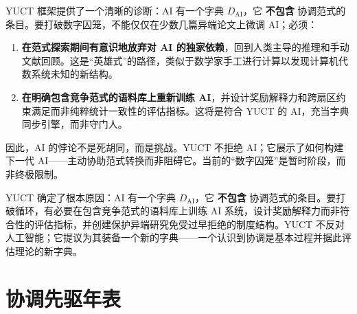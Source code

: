 \documentclass[12pt,a4paper]{article}
\begin{document}
	YUCT 框架提供了一个清晰的诊断：AI 有一个字典 \(D_{\text{AI}}\)，它 \textbf{不包含} 协调范式的条目。要打破数字囚笼，不能仅仅在少数几篇异端论文上微调 AI；必须：
	
	\begin{enumerate}
		\item \textbf{在范式探索期间有意识地放弃对 AI 的独家依赖}，回到人类主导的推理和手动文献回顾。这是“英雄式”的路径，类似于数学家手工进行计算以发现计算机代数系统未知的新结构。
		\item \textbf{在明确包含竞争范式的语料库上重新训练 AI}，并设计奖励解释力和跨扇区约束满足而非纯粹统计一致性的评估指标。这将是符合 YUCT 的 AI，充当字典同步引擎，而非守门人。
	\end{enumerate}
	
	因此，AI 的悖论不是死胡同，而是挑战。YUCT 不拒绝 AI；它展示了如何构建下一代 AI——主动协助范式转换而非阻碍它。当前的“数字囚笼”是暂时阶段，而非终极限制。
	
	YUCT 确定了根本原因：AI 有一个字典 \(D_{\text{AI}}\)，它 \textbf{不包含} 协调范式的条目。要打破循环，有必要在包含竞争范式的语料库上训练 AI 系统，设计奖励解释力而非符合性的评估指标，并创建保护异端研究免受过早拒绝的制度结构。YUCT 不反对人工智能；它提议为其装备一个新的字典——一个认识到协调是基本过程并据此评估理论的新字典。
	
	\section{协调先驱年表}
	
\end{document}
